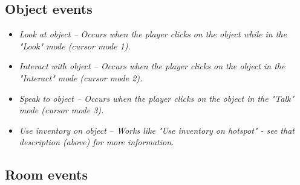 \subsection{Object events}%

\begin{itemize}
\item \it{Look at object} -- Occurs when the player clicks on the object while in
the "Look" mode (cursor mode 1).
\item \it{Interact with object} -- Occurs when the player clicks on the object in
the "Interact" mode (cursor mode 2).
\item \it{Speak to object} -- Occurs when the player clicks on the object in the
"Talk" mode (cursor mode 3).
\item \it{Use inventory on object} -- Works like "Use inventory on hotspot" - see
that description (above) for more information.
\end{itemize}

\subsection{Room events}%


